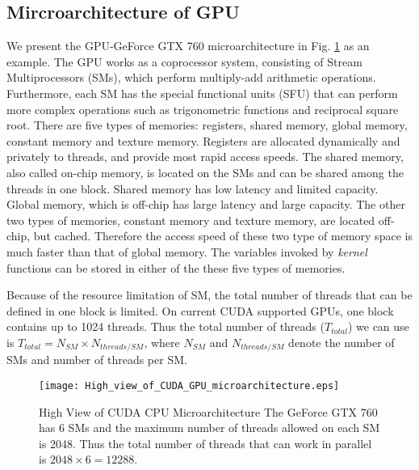 \documentclass[letterpaper, 10pt, conference]{ieeeconf}
\begin{document}
\subsection{Mircroarchitecture of GPU} 
We present the GPU-GeForce GTX 760 microarchitecture in Fig. \ref{figure2} as an example. The GPU works as a coprocessor system, consisting of Stream Multiprocessors (SMs), which perform multiply-add arithmetic operations. Furthermore, each SM has the special functional units (SFU) that can perform more complex operations such as trigonometric functions and reciprocal square root. There are five types of memories: registers, shared memory, global memory, constant memory and texture memory. Registers are allocated dynamically and privately to threads, and provide most rapid access speeds. The shared memory, also called on-chip memory, is located on the SMs and can be shared among the threads in one block. Shared memory has low latency and limited capacity. Global memory, which is off-chip has large latency and large capacity. The other two types of memories, constant memory and texture memory, are located off-chip, but cached. Therefore the access speed of these two type of memory space is much faster than that of global memory. The variables invoked by \textit{kernel} functions can be stored in either of the these five types of memories.

Because of the resource limitation of SM, the total number of threads that can be defined in one block is limited. On current CUDA supported GPUs, one block contains up to 1024 threads. Thus the total number of threads ($T_{total}$) we can use is $T_{total}=N_{SM}\times N_{threads/SM} $, where $N_{SM}$ and $N_{threads/SM}$ denote the number of SMs and number of threads per SM.  
\begin{figure}[htb]
\centering
\texttt{[image: High\_view\_of\_CUDA\_GPU\_microarchitecture.eps]}
\caption{ High View of CUDA CPU Microarchitecture
The GeForce GTX 760 has 6 SMs and the maximum number of threads allowed on each SM is 2048. Thus the total number of threads that can work in parallel is $2048\times 6=12288$.
}
\label{figure2}
\end{figure}   
\end{document}
